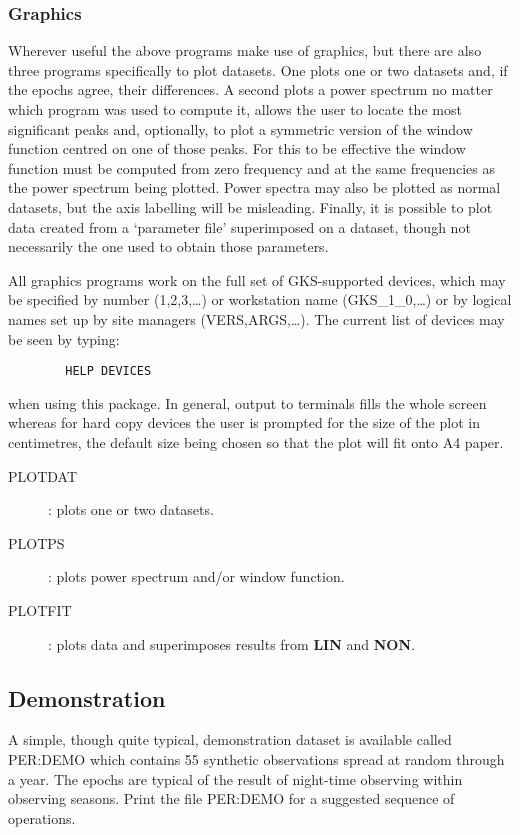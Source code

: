 \subsubsection {Graphics}
Wherever useful the above programs make use of graphics, but there are also
three programs specifically to plot datasets.
One plots one or two datasets and, if the epochs agree, their differences.
A second plots a power spectrum no matter which program was used to compute it,
allows the user to locate the most significant peaks and, optionally, to plot a
symmetric version of the window function centred on one of those peaks.
For this to be effective the window function must be computed from zero
frequency and at the same frequencies as the power spectrum being plotted.
Power spectra may also be plotted as normal datasets, but the axis labelling
will be misleading.
Finally, it is possible to plot data created from a `parameter file'
superimposed on a dataset, though not necessarily the one used to obtain those
parameters.

All graphics programs work on the full set of GKS-supported devices, which may
be specified by number (1,2,3,\ldots) or workstation name (GKS\_1\_0,\ldots) or
by logical names set up by site managers (VERS,ARGS,\ldots).
The current list of devices may be seen by typing:
\begin{verbatim}
        HELP DEVICES
\end{verbatim}
when using this package.
In general, output to terminals fills the whole screen whereas for hard copy
devices the user is prompted for the size of the plot in centimetres, the
default size being chosen so that the plot will fit onto A4 paper.
\begin{description}
\item [PLOTDAT]: plots one or two datasets.
\item [PLOTPS]: plots power spectrum and/or window function.
\item [PLOTFIT]: plots data and superimposes results from {\bf LIN} and
{\bf NON}.
\end{description}
\subsection {Demonstration}
A simple, though quite typical, demonstration dataset is available called
PER:DEMO which contains 55 synthetic observations spread at random through a
year.
The epochs are typical of the result of night-time observing within observing
seasons.
Print the file PER:DEMO for a suggested sequence of operations.
